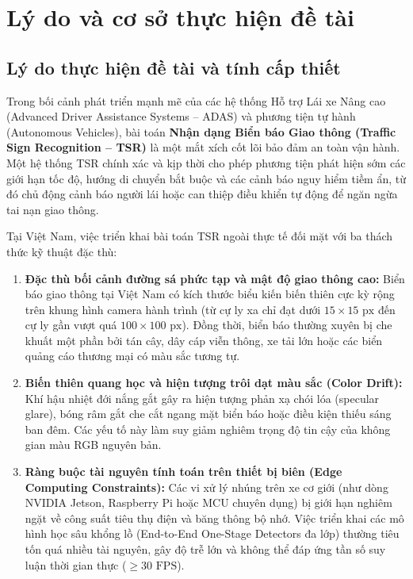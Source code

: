 \section{Lý do và cơ sở thực hiện đề tài}
\label{sec:ly_do}

\subsection{Lý do thực hiện đề tài và tính cấp thiết}
\label{subsec:cap_thiet}

Trong bối cảnh phát triển mạnh mẽ của các hệ thống Hỗ trợ Lái xe Nâng cao (Advanced Driver Assistance Systems -- ADAS) và phương tiện tự hành (Autonomous Vehicles), bài toán \textbf{Nhận dạng Biển báo Giao thông (Traffic Sign Recognition -- TSR)} là một mắt xích cốt lõi bảo đảm an toàn vận hành. Một hệ thống TSR chính xác và kịp thời cho phép phương tiện phát hiện sớm các giới hạn tốc độ, hướng di chuyển bắt buộc và các cảnh báo nguy hiểm tiềm ẩn, từ đó chủ động cảnh báo người lái hoặc can thiệp điều khiển tự động để ngăn ngừa tai nạn giao thông.

Tại Việt Nam, việc triển khai bài toán TSR ngoài thực tế đối mặt với ba thách thức kỹ thuật đặc thù:

\begin{enumerate}
    \item \textbf{Đặc thù bối cảnh đường sá phức tạp và mật độ giao thông cao:} Biển báo giao thông tại Việt Nam có kích thước biểu kiến biến thiên cực kỳ rộng trên khung hình camera hành trình (từ cự ly xa chỉ đạt dưới $15 \times 15\text{ px}$ đến cự ly gần vượt quá $100 \times 100\text{ px}$). Đồng thời, biển báo thường xuyên bị che khuất một phần bởi tán cây, dây cáp viễn thông, xe tải lớn hoặc các biển quảng cáo thương mại có màu sắc tương tự.
    \item \textbf{Biến thiên quang học và hiện tượng trôi dạt màu sắc (Color Drift):} Khí hậu nhiệt đới nắng gắt gây ra hiện tượng phản xạ chói lóa (specular glare), bóng râm gắt che cắt ngang mặt biển báo hoặc điều kiện thiếu sáng ban đêm. Các yếu tố này làm suy giảm nghiêm trọng độ tin cậy của không gian màu RGB nguyên bản.
    \item \textbf{Ràng buộc tài nguyên tính toán trên thiết bị biên (Edge Computing Constraints):} Các vi xử lý nhúng trên xe cơ giới (như dòng NVIDIA Jetson, Raspberry Pi hoặc MCU chuyên dụng) bị giới hạn nghiêm ngặt về công suất tiêu thụ điện và băng thông bộ nhớ. Việc triển khai các mô hình học sâu khổng lồ (End-to-End One-Stage Detectors đa lớp) thường tiêu tốn quá nhiều tài nguyên, gây độ trễ lớn và không thể đáp ứng tần số suy luận thời gian thực ($\ge 30\text{ FPS}$).
\end{enumerate}


